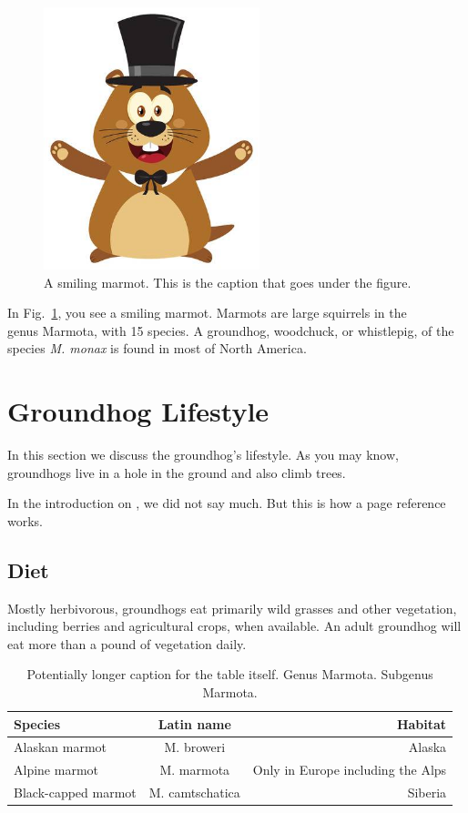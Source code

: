 \documentclass{article}
\begin{document}
\lipsum[1]

\begin{figure}[H]
    \centering
    \includegraphics[height=3in]{figures/smiling-marmot.jpg}
    \caption[Optional caption for list of figures]{A smiling marmot.  This is the caption that goes under the figure.}
    \label{fig:smiling-marmot}
\end{figure}

In Fig.~\ref{fig:smiling-marmot}, you see a smiling marmot.  Marmots are large squirrels in the\\
genus Marmota, with 15 species.  A groundhog, woodchuck, or whistlepig, of the species \textit{M. monax}
is found in most of North America.


\newpage
\section{Groundhog Lifestyle}
In this section we discuss the groundhog's lifestyle.  As you may know, groundhogs live in a hole
in the ground and also climb trees.

In the introduction on \pageref{sec:intro}, we did not say much.  But this is how a page reference
works.

\subsection{Diet}
Mostly herbivorous, groundhogs eat primarily wild grasses and other vegetation, including berries
and agricultural crops, when available.  An adult groundhog will eat more than a pound of vegetation daily.

\begin{table}[H]    %
    \centering
    \caption[Optional table caption for table of contents]{Potentially longer caption for the table itself.
    \label{tab:species}
    Genus Marmota.  Subgenus Marmota.}
    \begin{tabular}{l c r}    %
    Species & Latin name & Habitat\\ \hline
    Alaskan marmot & M. broweri & Alaska\\
    Alpine marmot & M. marmota & Only in Europe including the Alps\\
    Black-capped marmot & M. camtschatica & Siberia\\
    \end{tabular}
\end{table}
\end{document}
